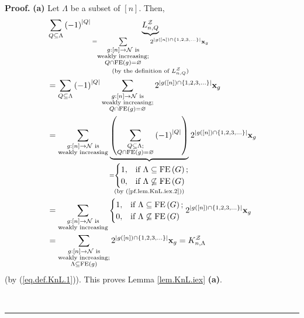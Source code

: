 \documentclass[numbers=enddot,12pt,final,onecolumn,notitlepage]{scrartcl}%
\theoremstyle{definition}
\newenvironment{proof}[1][Proof]{\noindent\textbf{#1.} }{\ \rule{0.5em}{0.5em}}
\newenvironment{verlong}{}{}
\let\sumnonlimits\sum
\renewcommand{\sum}{\sumnonlimits\limits}
\begin{document}
\begin{verlong}
\begin{proof}
\textbf{(a)} Let $\Lambda$ be a subset of $\left[  n\right]  $. Then,%
\begin{align*}
&  \sum_{Q\subseteq\Lambda}\left(  -1\right)  ^{\left\vert Q\right\vert
}\underbrace{L_{n,Q}^{\mathcal{Z}}}_{\substack{=\sum_{\substack{g:\left[
n\right]  \rightarrow\mathcal{N}\text{ is}\\\text{weakly increasing;}%
\\Q\cap\operatorname*{FE}\left(  g\right)  =\varnothing}}2^{\left\vert
g\left(  \left[  n\right]  \right)  \cap\left\{  1,2,3,\ldots\right\}
\right\vert }\mathbf{x}_{g}\\\text{(by the definition of }L_{n,Q}%
^{\mathcal{Z}}\text{)}}}\\
&  =\sum_{Q\subseteq\Lambda}\left(  -1\right)  ^{\left\vert Q\right\vert }%
\sum_{\substack{g:\left[  n\right]  \rightarrow\mathcal{N}\text{
is}\\\text{weakly increasing;}\\Q\cap\operatorname*{FE}\left(  g\right)
=\varnothing}}2^{\left\vert g\left(  \left[  n\right]  \right)  \cap\left\{
1,2,3,\ldots\right\}  \right\vert }\mathbf{x}_{g}\\
&  =\sum_{\substack{g:\left[  n\right]  \rightarrow\mathcal{N}\text{
is}\\\text{weakly increasing}}}\underbrace{\left(  \sum_{\substack{Q\subseteq
\Lambda;\\Q\cap\operatorname*{FE}\left(  g\right)  =\varnothing}}\left(
-1\right)  ^{\left\vert Q\right\vert }\right)  }_{\substack{=%
\begin{cases}
1, & \text{if }\Lambda\subseteq\operatorname*{FE}\left(  G\right)  ;\\
0, & \text{if }\Lambda\not \subseteq \operatorname*{FE}\left(  G\right)
\end{cases}
\\\text{(by (\ref{pf.lem.KnL.iex.2}))}}}2^{\left\vert g\left(  \left[
n\right]  \right)  \cap\left\{  1,2,3,\ldots\right\}  \right\vert }%
\mathbf{x}_{g}\\
&  =\sum_{\substack{g:\left[  n\right]  \rightarrow\mathcal{N}\text{
is}\\\text{weakly increasing}}}%
\begin{cases}
1, & \text{if }\Lambda\subseteq\operatorname*{FE}\left(  G\right)  ;\\
0, & \text{if }\Lambda\not \subseteq \operatorname*{FE}\left(  G\right)
\end{cases}
2^{\left\vert g\left(  \left[  n\right]  \right)  \cap\left\{  1,2,3,\ldots
\right\}  \right\vert }\mathbf{x}_{g}\\
&  =\sum_{\substack{g:\left[  n\right]  \rightarrow\mathcal{N}\text{
is}\\\text{weakly increasing;}\\\Lambda\subseteq\operatorname*{FE}\left(
g\right)  }}2^{\left\vert g\left(  \left[  n\right]  \right)  \cap\left\{
1,2,3,\ldots\right\}  \right\vert }\mathbf{x}_{g}=K_{n,\Lambda}^{\mathcal{Z}}%
\end{align*}
(by (\ref{eq.def.KnL.1})). This proves Lemma \ref{lem.KnL.iex} \textbf{(a)}.


\end{proof}
\end{verlong}
\end{document}
